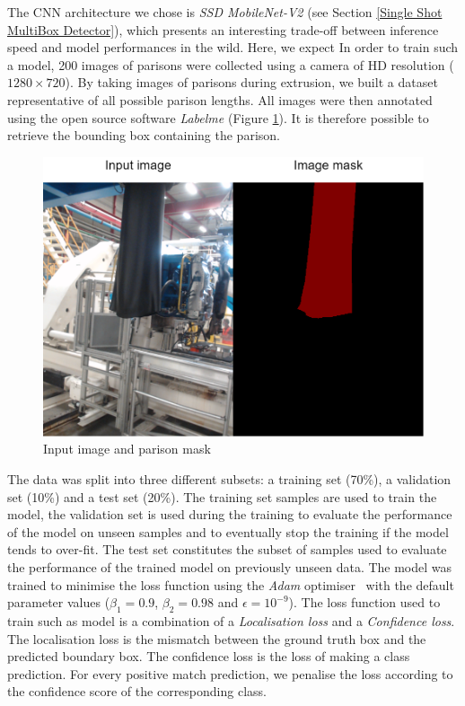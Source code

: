 The CNN architecture we chose is \textit{SSD MobileNet-V2}  (see Section \ref{Single Shot MultiBox Detector}), which presents an interesting trade-off between inference speed and model performances in the wild. Here, we expect 
In order to train such a model, 200 images of parisons were collected using a camera of HD resolution ($1280\times720$). By taking images of parisons during extrusion, we built a dataset representative of all possible parison lengths. All images were then annotated using the open source software \textit{Labelme} \citep{wada2016labelme} (Figure \ref{fig:input_and_label}). It is therefore possible to retrieve the bounding box containing the parison.   
\begin{figure}
\centerline{\includegraphics[scale=0.4]{images/chapter_3/input_and_label.png}}
\caption{Input image and parison mask}
\label{fig:input_and_label}
\end{figure}

The data was split into three different subsets: a training set (70\%), a validation set (10\%) and a test set (20\%). The training set samples are used to train the model, the validation set is used during the training to evaluate the performance of the model on unseen samples and to eventually stop the training if the model tends to over-fit. The test set constitutes the subset of samples used to evaluate the performance of the trained model on previously unseen data. The model was trained to minimise the loss function using the  \textit{Adam} optimiser~\citep{kingma2014adam} with the default parameter values ($\beta_{1} = 0.9$, $\beta_{2} = 0.98$ and $\epsilon = 10^{-9}$). The loss function used to train such as model is a combination of a \textit{Localisation loss} and a \textit{Confidence loss}. The localisation loss is the mismatch between the ground truth box and the predicted boundary box. The confidence loss is the loss of making a class prediction. For every positive match prediction, we penalise the loss according to the confidence score of the corresponding class.

